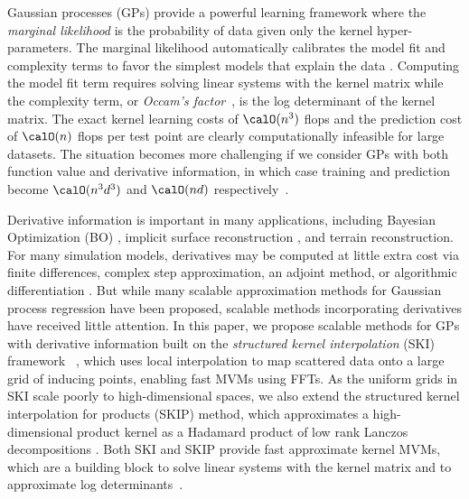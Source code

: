 Gaussian processes (GPs) provide a powerful learning framework where the 
\emph{marginal likelihood} is the probability of data given only the kernel
hyper-parameters.  The marginal likelihood automatically calibrates the model
fit and complexity terms to favor the simplest models that explain the data
\citep{rasmussen01, rasmussen06}. Computing the model fit term requires solving
linear systems with the kernel matrix while the complexity term, or 
\emph{Occam's factor}~\citep{mackay2003information}, is the log determinant of
the kernel matrix. The exact kernel learning costs of $\calO(n^3)$ flops and the
prediction cost of $\calO(n)$ flops per test point are clearly computationally
infeasible for large datasets.  The situation becomes more challenging if we
consider GPs with both function value and derivative information, in which case
training and prediction become $\calO(n^3d^3)$ and $\calO(nd)$
respectively~\citep[\S9.4]{rasmussen06}.

Derivative information is important in many applications, including Bayesian
Optimization (BO) \citep{wu2017bayesian}, implicit surface
reconstruction \citep{macedo2011hermite}, and terrain reconstruction.  For many
simulation models, derivatives may be computed at little extra cost via finite
differences, complex step approximation, an adjoint method, or algorithmic
differentiation \citep{forrester2008engineering}. But while many scalable
approximation methods for Gaussian process regression have been proposed,
scalable methods incorporating derivatives have received little attention. In
this paper, we propose scalable methods for GPs with derivative information
built on the {\em structured kernel interpolation} (SKI) framework~
\citep{wilson2015kernel}, which uses local interpolation to map scattered data
onto a large grid of inducing points, enabling fast MVMs using FFTs. As the
uniform grids in SKI scale poorly to high-dimensional spaces, we also extend the
structured kernel interpolation for products (SKIP) method, which approximates a
high-dimensional product kernel as a Hadamard product of low rank Lanczos
decompositions \citep{gardner2018product}. Both SKI and SKIP provide fast
approximate kernel MVMs, which are a building block to solve linear systems with
the kernel matrix and to approximate log determinants~\citep{dong2017scalable}.

